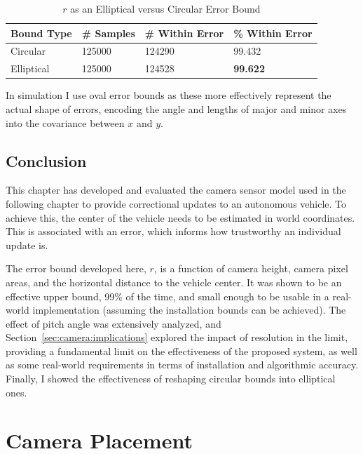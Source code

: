 \documentclass[a4paper,12pt,twoside,openright]{report}
\begin{document}
\begin{table}[htb]
    \centering
    \caption[Elliptical versus Circular Error Bound]{$r$ as an Elliptical versus Circular Error Bound}
    \label{tab:camera:ellipse vs circle}
    \begin{tabular}{@{}llll@{}}
        \toprule
        Bound Type    & \# Samples  & \# Within Error& \% Within Error \\ \midrule
        Circular      &   125000              & 124290                  & 99.432  \\
        Elliptical    &   125000              & 124528                  & \textbf{99.622}
    \end{tabular}
\end{table}


In simulation I use oval error bounds as these more effectively represent the 
actual shape of errors, encoding the angle and lengths of major
and minor axes into the covariance between $x$ and $y$.

\section{Conclusion}

This chapter has developed and evaluated the camera sensor model
used in the following chapter to provide correctional updates
to an autonomous vehicle. To achieve this, the center
of the vehicle needs to be estimated in world coordinates. This
is associated with an error, which informs how trustworthy
an individual update is.

The error bound developed here, $r$, is a function of camera height,
camera pixel areas, and the horizontal distance to the vehicle center.
It was shown to be an effective upper bound, 99\% of the time, and
small enough to be usable in a real-world implementation (assuming
the installation bounds can be achieved). The effect of pitch angle
was extensively analyzed, and Section~\ref{sec:camera:implications}
explored the impact of resolution in the limit, providing a 
fundamental limit on the effectiveness of the proposed system,
as well as some real-world requirements in terms of
installation and algorithmic accuracy. Finally, I showed
the effectiveness of reshaping circular bounds into elliptical ones.


\chapter{Camera Placement}
\label{chap:cameraplacement}
\end{document}
